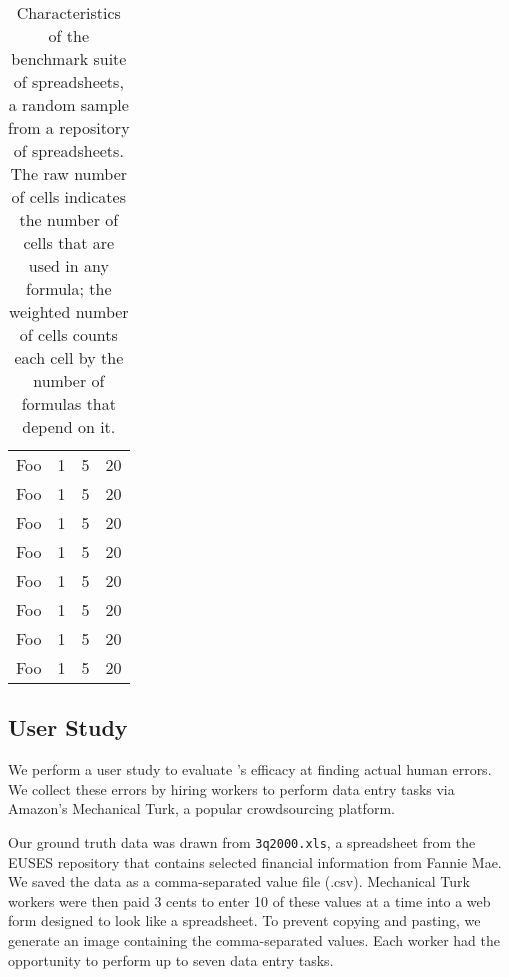\begin{table}[t!]
\begin{tabular}{l|rrr}
    \textsf{Foo} & \textsf{1} & \textsf{5}  & \textsf{20} \\
    \textsf{Foo} & \textsf{1} & \textsf{5}  & \textsf{20} \\
    \textsf{Foo} & \textsf{1} & \textsf{5}  & \textsf{20} \\
    \textsf{Foo} & \textsf{1} & \textsf{5}  & \textsf{20} \\
    \textsf{Foo} & \textsf{1} & \textsf{5}  & \textsf{20} \\
    \textsf{Foo} & \textsf{1} & \textsf{5}  & \textsf{20} \\
    \textsf{Foo} & \textsf{1} & \textsf{5}  & \textsf{20} \\
    \textsf{Foo} & \textsf{1} & \textsf{5}  & \textsf{20} \\
    \hline
    \end{tabular}%
  \caption{Characteristics of the benchmark suite of spreadsheets, a random sample from a repository of spreadsheets. The raw number of cells indicates the number of cells that are used in any formula; the weighted number of cells counts each cell by the number of formulas that depend on it.\label{tab:spreadsheet_characteristics}}
\end{table}





\subsection{User Study}

We perform a user study to evaluate \checkcell{}'s efficacy at finding
actual human errors. We collect these errors by hiring workers to
perform data entry tasks via Amazon's Mechanical Turk, a popular
crowdsourcing platform.

Our ground truth data was drawn from \texttt{3q2000.xls},
a spreadsheet from the EUSES repository that contains
selected financial information from Fannie Mae. We saved the data as
a comma-separated value file (.csv). Mechanical Turk workers were then paid
3 cents to enter 10 of these values at a time into a web form
designed to look like a spreadsheet. To prevent copying and pasting,
we generate an image containing the comma-separated values.  Each
worker had the opportunity to perform up to seven data entry tasks.

